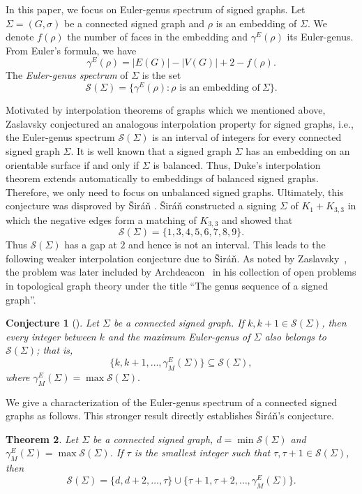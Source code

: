 \documentclass[12pt]{article}
\newtheorem{theorem}{Theorem}[section]
\newtheorem{conjecture}[theorem]{Conjecture}
\theoremstyle{definition}
\newcommand{\cS}{\mathcal S}
\begin{document}
In this paper, we focus on Euler-genus spectrum of signed graphs. Let $\Sigma=(G,\sigma)$ be a connected signed graph and $\rho$ is an embedding of $\Sigma$.
We denote $f(\rho)$ the number of faces in the embedding and $\gamma^E(\rho)$ its Euler-genus. From Euler's formula, we have
\[
\gamma^E(\rho)
=|E(G)|-|V(G)|+2-f(\rho).
\]
The \textit{Euler-genus spectrum} of $\Sigma$ is the set
\[
\mathcal{S}(\Sigma)
=\{\gamma^E(\rho):
\rho\text{ is an embedding of}~ \Sigma\}.
\]

Motivated by interpolation theorems of graphs which we mentioned above, Zaslavsky \cite{Zaslavsky1992} conjectured an analogous interpolation property for signed graphs, i.e., the Euler-genus spectrum $\mathcal{S}(\Sigma)$ is an interval of integers for every connected signed graph $\Sigma$.  It is well known  that a signed graph $\Sigma$ has an embedding on an orientable surface if and only if $\Sigma$ is balanced. Thus, Duke's interpolation theorem
extends automatically to embeddings of balanced signed graphs. Therefore, we only need to focus on unbalanced signed graphs.
Ultimately, this conjecture was disproved by \v{S}ir\'a\v{n} \cite{Siran1991}. \v{S}ir\'a\v{n} constructed a signing $\Sigma$ of $K_1+K_{3,3}$ in which the negative edges form a matching of $K_{3,3}$ and showed that
\[
\cS(\Sigma)=\{1,3,4,5,6,7,8,9\}.
\]
Thus $\cS(\Sigma)$ has a gap at $2$ and hence is not an interval.
This leads to the following weaker interpolation conjecture due to \v{S}ir\'a\v{n}. As noted by
Zaslavsky~\cite{Zaslavsky1998}, the problem was later included by Archdeacon~\cite{Archdeacon1999} in his collection of open problems in topological graph theory under the title ``The genus sequence of a signed graph''.

\begin{conjecture}[\cite{Siran1991,Archdeacon1999,Zaslavsky1998}]
\label{c1:1}
Let $\Sigma$ be a connected signed graph. If
$k,k+1\in\cS(\Sigma)$, then every integer between $k$ and the maximum
Euler-genus of $\Sigma$ also belongs to $\cS(\Sigma)$; that is,
\[
\{k,k+1,\ldots,\gamma^E_M(\Sigma)\}
\subseteq \cS(\Sigma),
\]
where $\gamma^E_M(\Sigma)=\max\cS(\Sigma).$
\end{conjecture}

We give a  characterization of the Euler-genus spectrum of a connected signed graphs as follows. This stronger result directly establishes \v{S}ir\'{a}\v{n}'s conjecture.

\begin{theorem}\label{t1:2}
Let $\Sigma$ be a connected signed graph,
$d=\min\cS(\Sigma)$ and $\gamma^E_M(\Sigma)=\max\cS(\Sigma)$. If $\tau$ is the smallest integer such that
$\tau,\tau+1\in\cS(\Sigma)$, then
\[
\cS(\Sigma)
=
\{d,d+2,\ldots,\tau\}
\cup
\{\tau+1,\tau+2,\ldots,\gamma_M^E(\Sigma)\}.
\]
\end{theorem}
\end{document}
